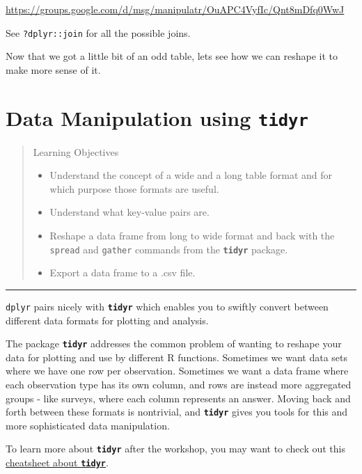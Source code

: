 \documentclass[]{book}
\providecommand{\tightlist}{%
  \setlength{\itemsep}{0pt}\setlength{\parskip}{0pt}}
\theoremstyle{definition}
\theoremstyle{definition}
\theoremstyle{definition}
\theoremstyle{remark}
\begin{document}
\url{https://groups.google.com/d/msg/manipulatr/OuAPC4VyfIc/Qnt8mDfq0WwJ}

See \texttt{?dplyr::join} for all the possible joins.

Now that we got a little bit of an odd table, lets see how we can
reshape it to make more sense of it.

\chapter{\texorpdfstring{Data Manipulation using
\textbf{\texttt{tidyr}}}{Data Manipulation using tidyr}}\label{tidyr}

\begin{quote}
Learning Objectives

\begin{itemize}
\tightlist
\item
  Understand the concept of a wide and a long table format and for which
  purpose those formats are useful.
\item
  Understand what key-value pairs are.
\item
  Reshape a data frame from long to wide format and back with the
  \texttt{spread} and \texttt{gather} commands from the
  \textbf{\texttt{tidyr}} package.
\item
  Export a data frame to a .csv file.
\end{itemize}
\end{quote}

\begin{center}\rule{0.5\linewidth}{\linethickness}\end{center}

\texttt{dplyr} pairs nicely with \textbf{\texttt{tidyr}} which enables
you to swiftly convert between different data formats for plotting and
analysis.

The package \textbf{\texttt{tidyr}} addresses the common problem of
wanting to reshape your data for plotting and use by different R
functions. Sometimes we want data sets where we have one row per
observation. Sometimes we want a data frame where each observation type
has its own column, and rows are instead more aggregated groups - like
surveys, where each column represents an answer. Moving back and forth
between these formats is nontrivial, and \textbf{\texttt{tidyr}} gives
you tools for this and more sophisticated data manipulation.

To learn more about \textbf{\texttt{tidyr}} after the workshop, you may
want to check out this
\href{https://github.com/rstudio/cheatsheets/raw/master/data-import.pdf}{cheatsheet
about \textbf{\texttt{tidyr}}}.
\end{document}
